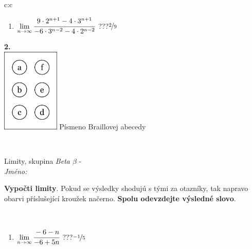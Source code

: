 \documentclass[10pt]{report}
\begin{document}
\begin{tabular}{c:c}
\begin{minipage}[c][104.5mm][t]{0.5\linewidth}
\begin{center}
\begin{minipage}{0.79\linewidth}
\begin{center}
\begin{varwidth}{\linewidth}
\begin{enumerate}
\item $\lim\limits_{n\to\infty}\cfrac{9\cdot 2^{n+1}-4\cdot 3^{n+1}}{-6\cdot 3^{n-2}-4\cdot 2^{n-2}}$\quad \dotfill\; ???\;\dotfill \quad $\nicefrac{2}{9}$
\end{enumerate}
\end{varwidth}
\end{center}
\end{minipage}
\begin{minipage}{0.20\linewidth}
\begin{center}
{\Huge\bfseries 2.} \\[2mm]
\includegraphics[height=40mm]{../images/braille.png}
{\small Písmeno Braillovej abecedy}
\end{center}
\end{minipage}
\end{center}
\end{minipage}
\\ \hdashline
\begin{minipage}[c][104.5mm][t]{0.5\linewidth}
\begin{center}
\vspace{7mm}
{\huge Limity, skupina \textit{Beta $\beta$} -}\\[5mm]
\textit{Jméno:}\phantom{xxxxxxxxxxxxxxxxxxxxxxxxxxxxxxxxxxxxxxxxxxxxxxxxxxxxxxxxxxxxxxxxx}\\[5mm]
\begin{minipage}{0.95\linewidth}
\begin{center}
\textbf{Vypočti limity}. Pokud se výsledky shodujú s tými za otazníky, tak napravo\\obarvi příslušející kroužek načerno. \textbf{Spolu odevzdejte výsledné slovo}.
\end{center}
\end{minipage}
\\[1mm]
\begin{minipage}{0.79\linewidth}
\begin{center}
\begin{varwidth}{\linewidth}
\begin{enumerate}
\normalsize
\item $\lim\limits_{n\to\infty}\cfrac{-6-n}{-6+5n}$\quad \dotfill\; ???\;\dotfill \quad $\nicefrac{-1}{5}$

\end{enumerate}
\end{varwidth}
\end{center}
\end{minipage}
\end{center}
\end{minipage}
\end{tabular}
\end{document}
